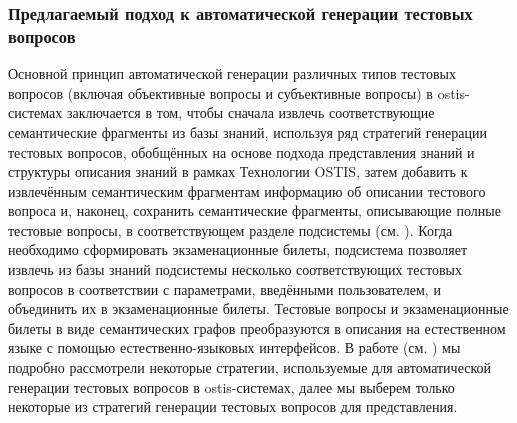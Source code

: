 \subsubsection{Предлагаемый подход к автоматической генерации тестовых вопросов}

Основной принцип автоматической генерации различных типов тестовых вопросов (включая объективные вопросы и субъективные вопросы) в ostis-системах заключается в том, чтобы сначала извлечь соответствующие семантические фрагменты из базы знаний, используя ряд стратегий генерации тестовых вопросов, обобщённых на основе подхода представления знаний и структуры описания знаний в рамках Технологии OSTIS, затем добавить к извлечённым семантическим фрагментам информацию об описании тестового вопроса и, наконец, сохранить семантические фрагменты, описывающие полные тестовые вопросы, в соответствующем разделе подсистемы (см. ). Когда необходимо сформировать экзаменационные билеты, подсистема позволяет извлечь из базы знаний подсистемы несколько соответствующих тестовых вопросов в соответствии с параметрами, введёнными пользователем, и объединить их в экзаменационные билеты. Тестовые вопросы и экзаменационные билеты в виде семантических графов преобразуются в описания на естественном языке с помощью естественно-языковых интерфейсов. В работе (см. ) мы подробно рассмотрели некоторые стратегии, используемые для автоматической генерации тестовых вопросов в ostis-системах, далее мы выберем только некоторые из стратегий генерации тестовых вопросов для представления.

